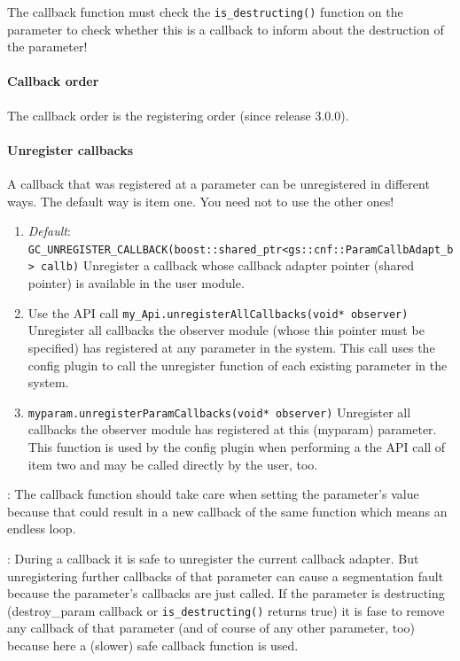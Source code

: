 The callback function must check the \lstinline|is_destructing()| function on the parameter to check whether this is a callback to inform about the destruction of the parameter!

\paragraph{Callback order} The callback order is the registering order (since \GreenControl release 3.0.0).

\paragraph{Unregister callbacks}   A callback that was registered at a parameter can be unregistered in different ways. The default way is item one. You need not to use the other ones!

\begin{enumerate}
  \item {\em Default}: \newline
  \lstinline|GC_UNREGISTER_CALLBACK(boost::shared_ptr<gs::cnf::ParamCallbAdapt_b> callb)| \newline
Unregister a callback whose callback adapter pointer (shared pointer) is available in the user module.
  \item Use the \GreenConfig API call \lstinline|my_Api.unregisterAllCallbacks(void* observer)| \newline
Unregister all callbacks the observer module (whose this pointer must be specified) has registered at any parameter in the system. This call uses the config plugin to call the unregister function of each existing parameter in the system.
  \item \lstinline|myparam.unregisterParamCallbacks(void* observer)| \newline
Unregister all callbacks the observer module has registered at this (myparam) parameter.
This function is used by the config plugin when performing a the API call of item two and may be called directly by the user, too.
\end{enumerate}

: The callback function should take care when setting the parameter's value because that could result in a new callback of the same function which means an endless loop.

: During a callback it is safe to unregister the current callback adapter. But unregistering further callbacks of that parameter can cause a segmentation fault because the parameter's callbacks are just called. If the parameter is destructing  (destroy\_param callback or \lstinline|is_destructing()| returns true) it is fase to remove any callback of that parameter (and of course of any other parameter, too) because here a (slower) safe callback function is used.

